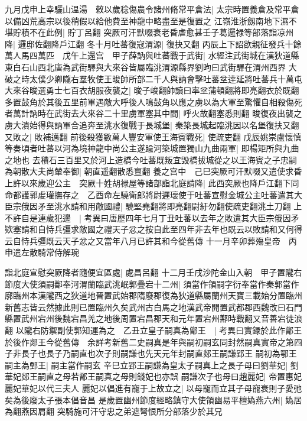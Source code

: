 九月戊申上幸驪山温湯　敕以歲稔傷農令諸州脩常平倉法|{
	太宗時置義倉及常平倉以備凶荒高宗以後稍假以給他費至神龍中略盡至是復置之}
江嶺淮浙劔南地下濕不堪貯積不在此例|{
	貯丁呂翻}
突厥可汗默啜衰老昏虐愈甚壬子葛邏禄等部落詣凉州降|{
	邏邸佐翻降戶江翻}
冬十月吐蕃復寇渭源|{
	復抉又翻}
丙辰上下詔欲親征發兵十餘萬人馬四萬匹　戊午上還宫　甲子薛訥與吐蕃戰于武街|{
	水經注武街城在漢狄道縣東白石山西北唐為武街驛與大來谷皆屬臨洮渭源縣界劉昫曰武街驛在渭州西界}
大破之時太僕少卿隴右羣牧使王晙帥所部二千人與訥會擊吐蕃坌逹延將吐蕃兵十萬屯大來谷晙選勇士七百衣胡服夜襲之|{
	晙子峻翻帥讀曰率坌蒲頓翻將即亮翻衣於既翻}
多置鼔角於其後五里前軍遇敵大呼後人鳴鼔角以應之虜以為大軍至驚懼自相殺傷死者萬計訥時在武街去大來谷二十里虜軍塞其中間|{
	呼火故翻塞悉則翻}
晙復夜出襲之虜大潰始得與訥軍合追奔至洮水復戰于長城堡|{
	秦築長城起臨洮因以名堡復扶又翻}
又敗之|{
	敗補邁翻}
前後殺獲數萬人豐安軍使王海賓戰死|{
	使疏吏翻}
戊辰姚崇盧懷慎等奏頃者吐蕃以河為境神龍中尚公主遂踰河築城置獨山九曲兩軍|{
	即楊矩所與九曲之地也}
去積石三百里又於河上造橋今吐蕃既叛宜毁橋拔城從之以王海賓之子忠嗣為朝散大夫尚輦奉御|{
	朝直遥翻散悉亶翻}
養之宫中　己巳突厥可汗默啜又遣使求昏上許以來歲迎公主　突厥十姓胡禄屋等諸部詣北庭請降|{
	此西突厥也降戶江翻下同}
命都護郭䖍瓘撫存之　乙酉命左驍衛郎將尉遲瓌使于吐蕃宣慰金城公主吐蕃遣其大臣宗俄因矛至洮水請和用敵國禮|{
	驍堅堯翻將即亮翻尉紆勿翻使疏吏翻洮土刀翻}
上不許自是連歲犯邊　|{
	考異曰唐歷四年七月丁丑吐蕃以去年之敗遣其大臣宗俄因矛欵塞請和自恃兵彊求敵國之禮天子忿之按自此至四年非去年也既云以敗請和又何得云自恃兵彊既云天子忿之又當年八月已許其和今從舊傳}
十一月辛卯葬殤皇帝　丙申遣左散騎常侍解琬

詣北庭宣慰突厥降者隨便宜區處|{
	處昌呂翻}
十二月壬戌沙陀金山入朝　甲子置隴右節度大使須嗣鄯奉河渭蘭臨武洮岷郭疊宕十二州|{
	須當作領嗣字衍奉當作秦郭當作廓臨州本漢隴西之狄道地晉置武始郡隋廢郡復為狄道縣屬蘭州天寶三載始分置臨州新舊志皆云然據此則已置臨州久矣武州古白馬之地漢武帝開置武都郡西魏改曰石門縣置武州宕州後魏宕昌羌之地後周置宕昌郡天和元年置宕州鄯時戰翻又音善宕徒浪翻}
以隴右防禦副使郭知運為之　乙丑立皇子嗣真為鄫王　|{
	考異曰實録於此作鄫王於後作郯王今從舊傳　余詳考新舊二史嗣真是年與嗣初嗣玄同封然嗣真實帝之第四子非長子也長子乃嗣直也次子則嗣謙也先天元年封嗣直郯王嗣謙郢王}
嗣初為鄂王嗣主為鄄王|{
	嗣主當作嗣玄}
辛巳立郢王嗣謙為皇太子嗣真上之長子母曰劉華妃|{
	劉華妃郯王嗣直之母若鄫王嗣真之母則錢妃也亦誤}
嗣謙次子也母曰趙麗妃|{
	帝置惠妃麗妃華妃以代三夫人}
麗妃以倡進有寵于上故立之|{
	以母寵而立其子母寵衰則子愛弛矣為後廢太子張本倡音昌}
是歲置幽州節度經略鎮守大使領幽易平檀媯燕六州|{
	媯居為翻燕因肩翻}
突騎施可汗守忠之弟遮弩恨所分部落少於其兄

